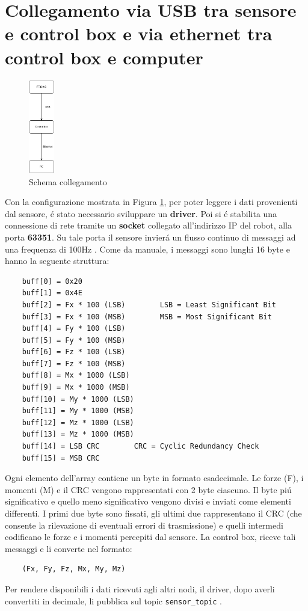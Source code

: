 \section{Collegamento via USB tra sensore e control box e via ethernet tra control box e computer}
\begin{figure}[H]
    \centering
    \includegraphics*[width=0.1\textwidth]{images/ft-cbox-pc.png}
    \caption{Schema collegamento}
    \label{fig:ft-cbox-pc}
\end{figure}
Con la configurazione mostrata in Figura \ref{fig:ft-cbox-pc}, per poter leggere i dati provenienti dal sensore, \'{e} stato 
necessario sviluppare un \textbf{driver}. 
Poi si \'{e} stabilita una connessione di rete tramite un \textbf{socket} collegato all'indirizzo IP del robot, 
alla porta \textbf{63351}. 
Su tale porta il sensore invier\'{a} un flusso continuo di messaggi ad una frequenza di 100Hz \cite{ft_sensor}. 
Come da manuale, i messaggi sono lunghi 16 byte e hanno la seguente struttura: 
\begin{verbatim}
    buff[0] = 0x20
    buff[1] = 0x4E
    buff[2] = Fx * 100 (LSB)        LSB = Least Significant Bit
    buff[3] = Fx * 100 (MSB)        MSB = Most Significant Bit
    buff[4] = Fy * 100 (LSB)
    buff[5] = Fy * 100 (MSB)
    buff[6] = Fz * 100 (LSB)
    buff[7] = Fz * 100 (MSB)
    buff[8] = Mx * 1000 (LSB)
    buff[9] = Mx * 1000 (MSB)
    buff[10] = My * 1000 (LSB)
    buff[11] = My * 1000 (MSB)
    buff[12] = Mz * 1000 (LSB)
    buff[13] = Mz * 1000 (MSB)
    buff[14] = LSB CRC        CRC = Cyclic Redundancy Check
    buff[15] = MSB CRC
\end{verbatim} 
Ogni elemento dell'array contiene un byte in formato esadecimale. 
Le forze (F), i momenti (M) e il CRC vengono rappresentati con 2 byte ciascuno. Il byte pi\'{u} significativo e quello meno significativo 
vengono divisi e inviati come elementi differenti.
I primi due byte sono fissati, gli ultimi due rappresentano il CRC (che consente la rilevazione di eventuali errori di 
trasmissione) e quelli intermedi codificano le forze e i momenti percepiti dal sensore. 
La control box, riceve tali messaggi e li converte nel formato:
\begin{verbatim}
    (Fx, Fy, Fz, Mx, My, Mz)
\end{verbatim}
Per rendere disponibili i dati ricevuti agli altri nodi, il driver, dopo averli convertiti in decimale, li pubblica sul 
topic \verb|sensor_topic| \cite{ft_driver}.
